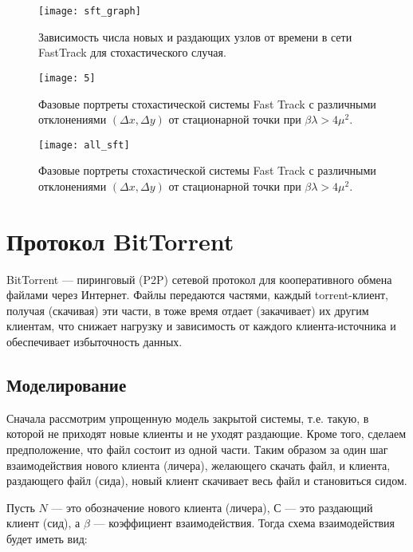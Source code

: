 \documentclass[floatfix,
showkeys,
twocolumn, nofootinbib, superscriptaddress, ]{revtex4-1}
\begin{document}
\begin{figure}\centering
  \texttt{[image: sft\_graph]}
  \caption{Зависимость числа новых и раздающих узлов от времени в
    сети FastTrack для стохастического случая.}
\label{fig:sft_graph}
\end{figure}


\begin{figure}\centering
  \texttt{[image: 5]}
  \caption{Фазовые портреты стохастической системы Fast Track с
    различными отклонениями $(\Delta x, \Delta y)$ от стационарной
    точки при $\beta \lambda > 4\mu^2$.}
\label{fig:ft5}
\end{figure}



\begin{figure}\centering
  \texttt{[image: all\_sft]}
  \caption{Фазовые портреты стохастической системы Fast Track с
    различными отклонениями $(\Delta x, \Delta y)$ от стационарной
    точки при $\beta \lambda > 4\mu^2$.}
\label{fig:all_sft}
\end{figure}

\section{Протокол BitTorrent}

BitTorrent --- пиринговый (P2P) сетевой протокол для кооперативного
обмена файлами через Интернет. Файлы передаются частями, каждый
torrent-клиент, получая (скачивая) эти части, в тоже время отдает
(закачивает) их другим клиентам, что снижает нагрузку и зависимость от
каждого клиента-источника и обеспечивает избыточность данных.

\subsection{Моделирование}

Сначала рассмотрим упрощенную модель закрытой системы, т.е. такую, в
которой не приходят новые клиенты и не уходят раздающие. Кроме того,
сделаем предположение, что файл состоит из одной части. Таким образом
за один шаг взаимодействия нового клиента (личера), желающего скачать
файл, и клиента, раздающего файл (сида), новый клиент скачивает весь
файл и становиться сидом.


Пусть $N$ --- это обозначение нового клиента (личера), $С$ --- это
раздающий клиент (сид), а $\beta$ --- коэффициент
взаимодействия. Тогда схема взаимодействия будет иметь вид:
\end{document}
